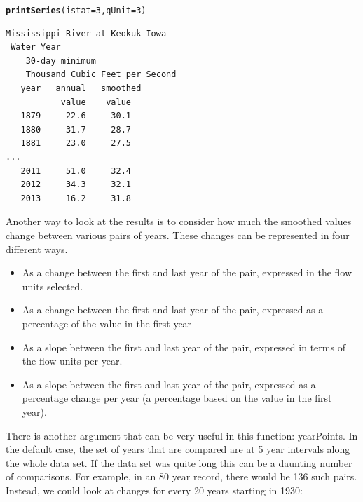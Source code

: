 \documentclass[a4paper,11pt]{article}\usepackage{graphicx, color}
\makeatletter
\newcommand{\hlfunctioncall}[1]{\textcolor[rgb]{0.501960784313725,0,0.329411764705882}{\textbf{#1}}}%
\newenvironment{kframe}{%
 \def\at@end@of@kframe{}%
 \ifinner\ifhmode%
  \def\at@end@of@kframe{\end{minipage}}%
  \begin{minipage}{\columnwidth}%
 \fi\fi%
 \def\FrameCommand##1{\hskip\@totalleftmargin \hskip-\fboxsep
 \colorbox{shadecolor}{##1}\hskip-\fboxsep
     \hskip-\linewidth \hskip-\@totalleftmargin \hskip\columnwidth}%
 \MakeFramed {\advance\hsize-\width
   \@totalleftmargin\z@ \linewidth\hsize
   \@setminipage}}%
 {\par\unskip\endMakeFramed%
 \at@end@of@kframe}
\newenvironment{knitrout}{}{} %
\makeatother
\begin{document}
\begin{knitrout}
\color{fgcolor}\begin{kframe}
\begin{alltt}
\hlfunctioncall{printSeries}(istat=3, qUnit=3)
\end{alltt}
\end{kframe}
\end{knitrout}


\begin{verbatim}
Mississippi River at Keokuk Iowa
 Water Year
    30-day minimum
    Thousand Cubic Feet per Second
   year   annual   smoothed
           value    value
   1879     22.6     30.1
   1880     31.7     28.7
   1881     23.0     27.5
...
   2011     51.0     32.4
   2012     34.3     32.1
   2013     16.2     31.8
\end{verbatim}

Another way to look at the results is to consider how much the smoothed values change between various pairs of years.  These changes can be represented in four different ways.  
\begin{itemize}
  \item As a change between the first and last year of the pair, expressed in the flow units selected.
  \item As a change between the first and last year of the pair, expressed as a percentage of the value in the first year
  \item As a slope between the first and last year of the pair, expressed in terms of the flow units per year.
  \item As a slope between the first and last year of the pair, expressed as a percentage change per year (a percentage based on the value in the first year).
\end{itemize}

There is another argument that can be very useful in this function: yearPoints.  In the default case, the set of years that are compared are at 5 year intervals along the whole data set.  If the data set was quite long this can be a daunting number of comparisons.  For example, in an 80 year record, there would be 136 such pairs. Instead, we could look at changes for every 20 years starting in 1930: 
\end{document}
